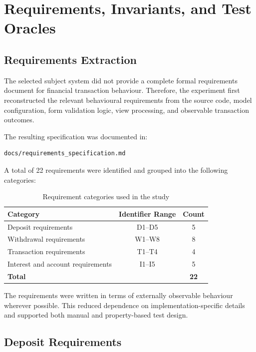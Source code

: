 \documentclass[12pt]{article}
\begin{document}
\section{Requirements, Invariants, and Test Oracles}

\subsection{Requirements Extraction}

The selected subject system did not provide a complete formal requirements
document for financial transaction behaviour. Therefore, the experiment
first reconstructed the relevant behavioural requirements from the source
code, model configuration, form validation logic, view processing, and
observable transaction outcomes.

The resulting specification was documented in:

\begin{verbatim}
docs/requirements_specification.md
\end{verbatim}

A total of 22 requirements were identified and grouped into the following
categories:

\begin{table}[H]
\centering
\caption{Requirement categories used in the study}
\label{tab:requirement-categories}

\begin{tabular}{|l|c|c|}
\hline
\textbf{Category} & \textbf{Identifier Range} & \textbf{Count} \\
\hline
Deposit requirements & D1--D5 & 5 \\
\hline
Withdrawal requirements & W1--W8 & 8 \\
\hline
Transaction requirements & T1--T4 & 4 \\
\hline
Interest and account requirements & I1--I5 & 5 \\
\hline
\textbf{Total} & & \textbf{22} \\
\hline
\end{tabular}

\end{table}

The requirements were written in terms of externally observable behaviour
wherever possible. This reduced dependence on implementation-specific details
and supported both manual and property-based test design.

\subsection{Deposit Requirements}
\end{document}
